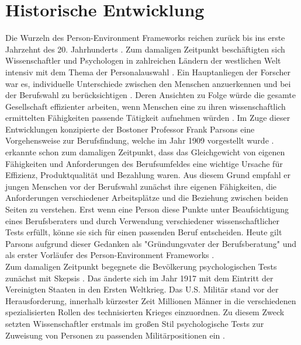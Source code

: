 \section{Historische Entwicklung}
\label{ch:personEnvironmentFit:historisches}
Die Wurzeln des Person-Environment Frameworks reichen zurück bis ins erste Jahrzehnt des 20. Jahrhunderts \cite[S. 1]{su:2015}. Zum damaligen Zeitpunkt beschäftigten sich Wissenschaftler und Psychologen in zahlreichen Ländern der westlichen Welt intensiv mit dem Thema der Personalauswahl \cite[S. 1]{salgado:2001}. Ein Hauptanliegen der Forscher war es, individuelle Unterschiede zwischen den Menschen anzuerkennen und bei der Berufswahl zu berücksichtigen \cite[S. 2ff.]{stern:1900}. Deren Ansichten zu Folge würde die gesamte Gesellschaft effizienter arbeiten, wenn Menschen eine zu ihren wissenschaftlich ermittelten Fähigkeiten passende Tätigkeit aufnehmen würden \cite[S.2]{kevles:1968}\cite[S. 3]{parsons:1909}. Im Zuge dieser Entwicklungen konzipierte der Bostoner Professor Frank Parsons eine Vorgehensweise zur Berufsfindung, welche im Jahr 1909 vorgestellt wurde \cite[S. 1]{su:2015}. \textcite[S. 5ff.]{parsons:1909} erkannte schon zum damaligen Zeitpunkt, dass das Gleichgewicht von eigenen Fähigkeiten und Anforderungen des Berufsumfeldes eine wichtige Ursache für Effizienz, Produktqualität und Bezahlung waren. Aus diesem Grund empfahl er jungen Menschen vor der Berufswahl zunächst ihre eigenen Fähigkeiten, die Anforderungen verschiedener Arbeitsplätze und die Beziehung zwischen beiden Seiten zu verstehen. Erst wenn eine Person diese Punkte unter Beaufsichtigung eines Berufsberaters und durch Verwendung verschiedener wissenschaftlicher Tests erfüllt, könne sie sich für einen passenden Beruf entscheiden. Heute gilt Parsons aufgrund dieser Gedanken als "Gründungsvater der Berufsberatung" \cite[S. 3]{porfeli:2009} und als erster Vorläufer des Person-Environment Frameworks \cite[S. 2]{edwards:2008}.\\
Zum damaligen Zeitpunkt begegnete die Bevölkerung psychologischen Tests zunächst mit Skepsis \cite[S. 2]{kevles:1968}. Das änderte sich im Jahr 1917 mit dem Eintritt der Vereinigten Staaten in den Ersten Weltkrieg. Das U.S. Militär stand vor der Herausforderung, innerhalb kürzester Zeit Millionen Männer in die verschiedenen spezialisierten Rollen des technisierten Krieges einzuordnen. Zu diesem Zweck setzten Wissenschaftler erstmals im großen Stil psychologische Tests zur Zuweisung von Personen zu passenden Militärpositionen ein \cite[S. 2ff.]{kevles:1968}. \\
